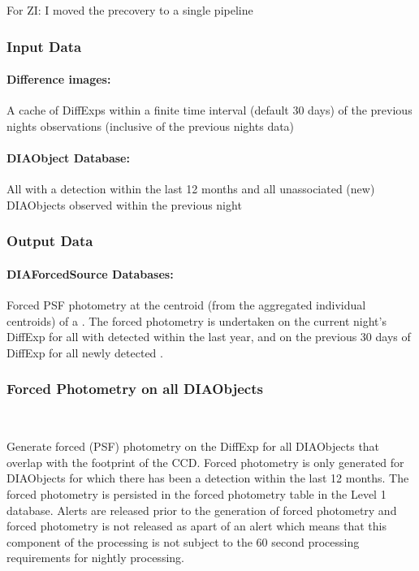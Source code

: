 \begin{note}{For ZI: I moved the precovery to a single pipeline}\end{note}
\subsubsection{Input Data}

\paragraph*{Difference images:} A cache of DiffExps within a finite time interval (default 30 days) of the previous nights observations (inclusive of the previous nights data)

\paragraph*{DIAObject Database:} All \DIAObjects with a \DIASource detection within the last 12 months and all unassociated (new) DIAObjects observed within the previous night


\subsubsection{Output Data}

\paragraph*{DIAForcedSource Databases:} Forced PSF photometry at the centroid (from the aggregated individual \DIASource centroids) of a \DIAObject. The forced photometry is undertaken on the current night's DiffExp for all \DIAObjects with \DIASources detected within the last year, and on the previous 30 days of DiffExp for all newly detected \DIASources.


\subsubsection{Forced Photometry on all DIAObjects}~

Generate forced (PSF) photometry on the DiffExp for all DIAObjects that overlap with the footprint of the CCD. Forced photometry is only generated for DIAObjects for which there has been a \DIASource detection within the last 12 months. The forced photometry is persisted in the forced photometry table in the Level 1 database. Alerts are released prior to the generation of forced photometry and forced photometry is not released as apart of an alert which means that this component of the processing is not subject to the 60 second processing requirements for nightly processing.

